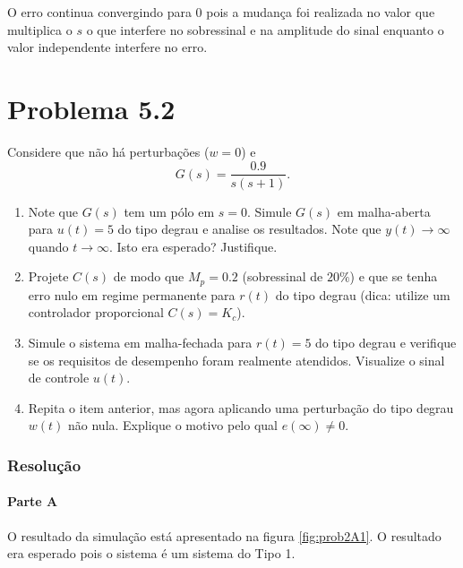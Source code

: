 \documentclass[
]{book}
\providecommand{\tightlist}{%
  \setlength{\itemsep}{0pt}\setlength{\parskip}{0pt}}
\theoremstyle{definition}
\theoremstyle{definition}
\theoremstyle{definition}
\theoremstyle{remark}
\begin{document}
O erro continua convergindo para 0 pois a mudança foi realizada no valor que multiplica o \(s\) o que interfere no sobressinal e na amplitude do sinal enquanto o valor independente interfere no erro.

\hypertarget{problema-5.2}{%
\section*{Problema 5.2}\label{problema-5.2}}

Considere que não há perturbações (\(w=0\)) e
\[
G(s) = \frac{0.9}{s(s+1)}.
\]

\begin{enumerate}
\def\labelenumi{(\alph{enumi})}
\tightlist
\item
  Note que \(G(s)\) tem um pólo em \(s=0\). Simule \(G(s)\) em malha-aberta para \(u(t) = 5\) do tipo degrau e analise os resultados. Note que \(y(t) \to \infty\) quando \(t \to \infty\). Isto era esperado? Justifique.
\item
  Projete \(C(s)\) de modo que \(M_p = 0.2\) (sobressinal de \(20\%\)) e que se tenha erro nulo em regime permanente para \(r(t)\) do tipo degrau (dica: utilize um controlador proporcional \(C(s) = K_c\)).
\item
  Simule o sistema em malha-fechada para \(r(t) = 5\) do tipo degrau e verifique se os requisitos de desempenho foram realmente atendidos. Visualize o sinal de controle \(u(t)\).
\item
  Repita o item anterior, mas agora aplicando uma perturbação do tipo degrau \(w(t)\) não nula. Explique o motivo pelo qual \(e(\infty) \neq 0\).
\end{enumerate}

\hypertarget{resoluuxe7uxe3o-1}{%
\subsubsection*{Resolução}\label{resoluuxe7uxe3o-1}}

\hypertarget{parte-a-1}{%
\paragraph*{Parte A}\label{parte-a-1}}

O resultado da simulação está apresentado na figura \ref{fig:prob2A1}. O resultado era esperado pois o sistema é um sistema do Tipo 1.
\end{document}
